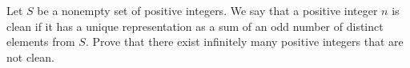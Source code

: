 Let 
$S$
 be a nonempty set of positive integers. We say that a positive integer 
$n$
 is 
clean
 if it has a unique representation as a sum of an odd number of distinct elements from 
$S$.
 Prove that there exist infinitely many positive integers that are not clean.
